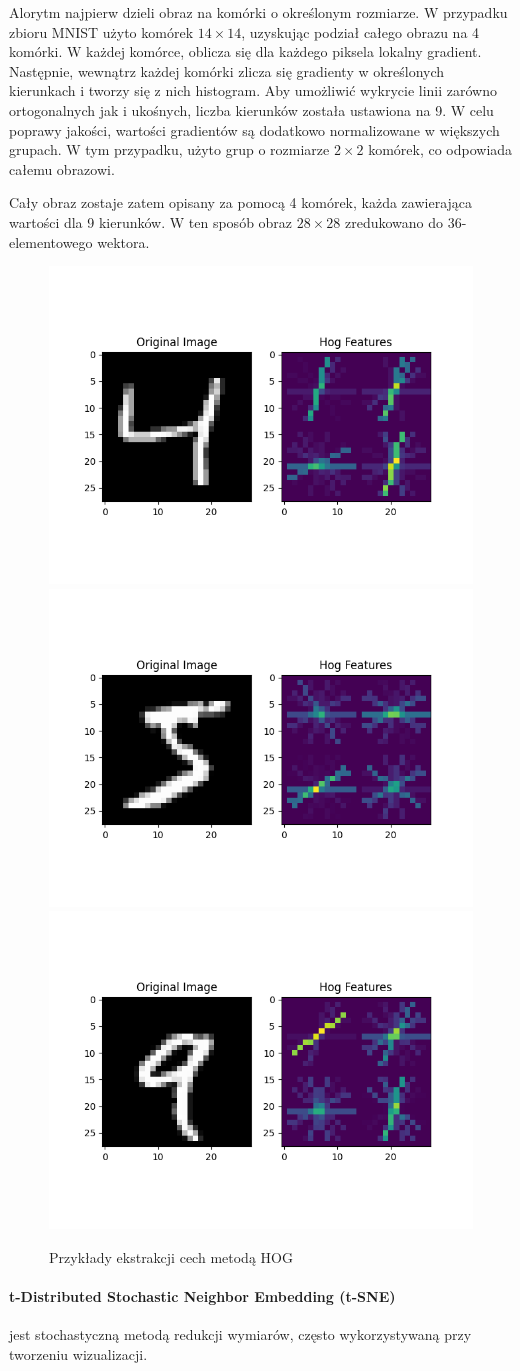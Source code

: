 \documentclass[10pt]{article}
\begin{document}
Alorytm najpierw dzieli obraz na komórki o określonym rozmiarze. W przypadku zbioru MNIST użyto komórek $14\times14$, uzyskując podział całego obrazu na 4 komórki.
W każdej komórce, oblicza się dla każdego piksela lokalny gradient.
Następnie, wewnątrz każdej komórki zlicza się gradienty w określonych kierunkach i tworzy się z nich histogram.
Aby umożliwić wykrycie linii zarówno ortogonalnych jak i ukośnych, liczba kierunków została ustawiona na 9.
W celu poprawy jakości, wartości gradientów są dodatkowo normalizowane w większych grupach.
W tym przypadku, użyto grup o rozmiarze $2\times2$ komórek, co odpowiada całemu obrazowi.

Cały obraz zostaje zatem opisany za pomocą 4 komórek, każda zawierająca wartości dla 9 kierunków.
W ten sposób obraz $28\times28$ zredukowano do 36-elementowego wektora.

\begin{figure}[H]\centering
    \includegraphics[width=.32\linewidth]{img/hog_vis/4.png}
    \hfill
    \includegraphics[width=.32\linewidth]{img/hog_vis/5.png}
    \hfill
    \includegraphics[width=.32\linewidth]{img/hog_vis/9.png}
    \caption{Przykłady ekstrakcji cech metodą HOG}
\end{figure}




\paragraph{t-Distributed Stochastic Neighbor Embedding (t-SNE)} jest stochastyczną metodą redukcji wymiarów, często wykorzystywaną przy tworzeniu wizualizacji.
\end{document}
